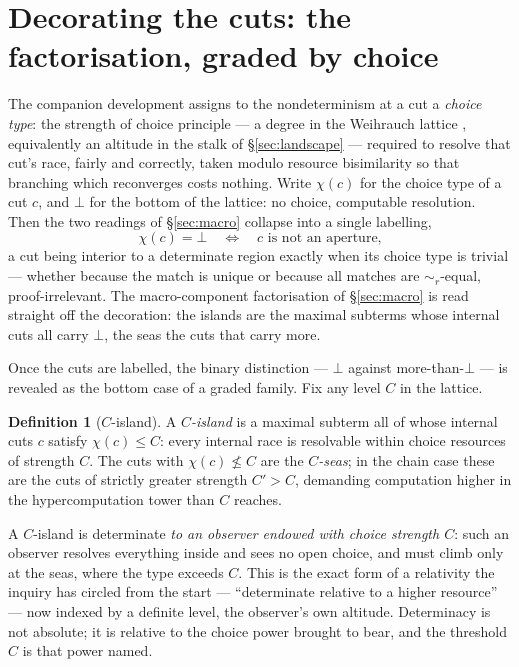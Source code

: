 \documentclass[11pt]{article}
\theoremstyle{definition}
\newtheorem{definition}{Definition}
\theoremstyle{plain}
\theoremstyle{remark}
\newcommand{\rbisim}{\sim_{r}}
\begin{document}
\section{Decorating the cuts: the factorisation, graded by choice}\label{sec:graded}

The companion development \cite{choicesched} assigns to the nondeterminism at a cut a
\emph{choice type}: the strength of choice principle --- a degree in the Weihrauch lattice
\cite{weihrauch}, equivalently an altitude in the stalk of \S\ref{sec:landscape} --- required to
resolve that cut's race, fairly and correctly, taken modulo resource bisimilarity so that
branching which reconverges costs nothing. Write $\chi(c)$ for the choice type of a cut $c$, and
$\bot$ for the bottom of the lattice: no choice, computable resolution. Then the two readings of
\S\ref{sec:macro} collapse into a single labelling,
\[
\chi(c) = \bot \quad\Longleftrightarrow\quad c \text{ is not an aperture,}
\]
a cut being interior to a determinate region exactly when its choice type is trivial --- whether
because the match is unique or because all matches are $\rbisim$-equal, proof-irrelevant. The
macro-component factorisation of \S\ref{sec:macro} is read straight off the decoration: the islands
are the maximal subterms whose internal cuts all carry $\bot$, the seas the cuts that carry more.

Once the cuts are labelled, the binary distinction --- $\bot$ against more-than-$\bot$ --- is
revealed as the bottom case of a graded family. Fix any level $C$ in the lattice.

\begin{definition}[$C$-island]\label{def:cisland}
A \emph{$C$-island} is a maximal subterm all of whose internal cuts $c$ satisfy $\chi(c) \le C$:
every internal race is resolvable within choice resources of strength $C$. The cuts with
$\chi(c) \not\le C$ are the \emph{$C$-seas}; in the chain case these are the cuts of strictly
greater strength $C' > C$, demanding computation higher in the hypercomputation tower than $C$
reaches.
\end{definition}

\noindent
A $C$-island is determinate \emph{to an observer endowed with choice strength $C$}: such an
observer resolves everything inside and sees no open choice, and must climb only at the seas, where
the type exceeds $C$. This is the exact form of a relativity the inquiry has circled from the start
--- ``determinate relative to a higher resource'' --- now indexed by a definite level, the
observer's own altitude. Determinacy is not absolute; it is relative to the choice power brought to
bear, and the threshold $C$ is that power named.
\end{document}
